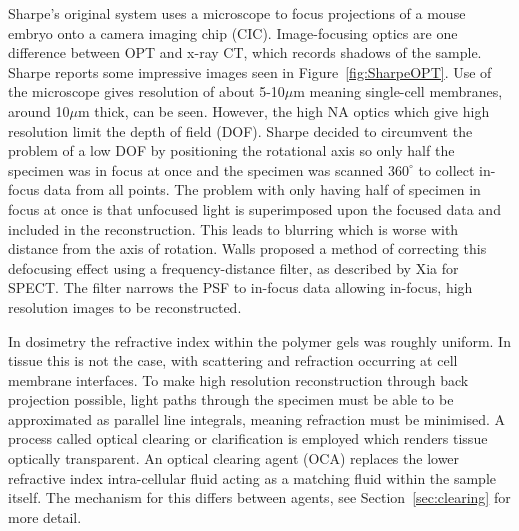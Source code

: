 \documentclass[12pt]{article}
\begin{document}
Sharpe's original system uses a microscope to focus projections of a mouse embryo onto a camera imaging chip (CIC). Image-focusing optics are one difference between OPT and x-ray CT, which records shadows of the sample. \cite{Sharpe:2002jp} Sharpe reports some impressive images seen in Figure~\ref{fig:SharpeOPT}. Use of the microscope gives resolution of about 5-10$\mu$m meaning single-cell membranes, around 10$\mu$m thick, can be seen.\cite{Sharpe:2002jp} However, the high NA  optics which give high resolution limit the depth of field (DOF). Sharpe decided to circumvent the problem of a low DOF by positioning the rotational axis so only half the specimen was in focus at once and the specimen was scanned $360^{\circ}$ to collect in-focus data from all points. 
The problem with only having half of specimen in focus at once is that unfocused light is superimposed upon the focused data and included in the reconstruction. This leads to blurring which is worse with distance from the axis of rotation. Walls proposed a method of correcting this defocusing effect using a frequency-distance filter, as described by Xia for SPECT. \cite{xia1995fourier,Walls:2007jl} The filter narrows the PSF to in-focus data allowing in-focus, high resolution images to be reconstructed. \cite{Walls:2007jl}


In dosimetry the refractive index within the polymer gels was roughly uniform. In tissue this is not the case, with scattering and refraction occurring at cell membrane interfaces. To make high resolution reconstruction through back projection possible, light paths through the specimen must be able to  be approximated as parallel line integrals, meaning refraction must be minimised. A process called optical clearing or clarification is employed which renders tissue optically transparent. An optical clearing agent (OCA) replaces the lower refractive index intra-cellular fluid acting as a matching fluid within the sample itself. The mechanism for this differs between agents, see Section~\ref{sec:clearing} for more detail. 
\end{document}
